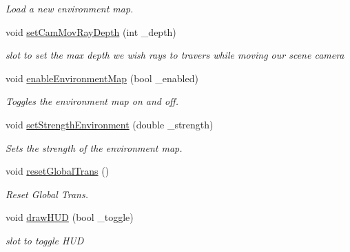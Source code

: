 \begin{DoxyCompactItemize}
\begin{DoxyCompactList}\small\item\em Load a new environment map. \end{DoxyCompactList}\item 
void \hyperlink{class_open_g_l_widget_a0de05e67532cae5c3b4d5c5d4fc378aa}{set\-Cam\-Mov\-Ray\-Depth} (int \-\_\-depth)
\begin{DoxyCompactList}\small\item\em slot to set the max depth we wish rays to travers while moving our scene camera \end{DoxyCompactList}\item 
\hypertarget{class_open_g_l_widget_aaa5b62c05c82cf2c5b253bc36608d3fc}{void \hyperlink{class_open_g_l_widget_aaa5b62c05c82cf2c5b253bc36608d3fc}{enable\-Environment\-Map} (bool \-\_\-enabled)}\label{class_open_g_l_widget_aaa5b62c05c82cf2c5b253bc36608d3fc}

\begin{DoxyCompactList}\small\item\em Toggles the environment map on and off. \end{DoxyCompactList}\item 
\hypertarget{class_open_g_l_widget_a8866e109f82d389c566ff559879c1853}{void \hyperlink{class_open_g_l_widget_a8866e109f82d389c566ff559879c1853}{set\-Strength\-Environment} (double \-\_\-strength)}\label{class_open_g_l_widget_a8866e109f82d389c566ff559879c1853}

\begin{DoxyCompactList}\small\item\em Sets the strength of the environment map. \end{DoxyCompactList}\item 
\hypertarget{class_open_g_l_widget_a101d91ac750f7980b75ee3fcb48a3f36}{void \hyperlink{class_open_g_l_widget_a101d91ac750f7980b75ee3fcb48a3f36}{reset\-Global\-Trans} ()}\label{class_open_g_l_widget_a101d91ac750f7980b75ee3fcb48a3f36}

\begin{DoxyCompactList}\small\item\em Reset Global Trans. \end{DoxyCompactList}\item 
\hypertarget{class_open_g_l_widget_a07cdb697f599274db75f930222268e77}{void \hyperlink{class_open_g_l_widget_a07cdb697f599274db75f930222268e77}{draw\-H\-U\-D} (bool \-\_\-toggle)}\label{class_open_g_l_widget_a07cdb697f599274db75f930222268e77}

\begin{DoxyCompactList}\small\item\em slot to toggle H\-U\-D \end{DoxyCompactList}\end{DoxyCompactItemize}

